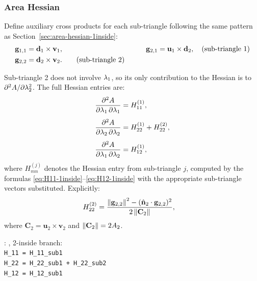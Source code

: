 \documentclass[11pt,a4paper]{article}
\begin{document}
\subsubsection{Area Hessian}

Define auxiliary cross products for each sub-triangle following the same
pattern as Section~\ref{sec:area-hessian-1inside}:
\begin{alignat}{2}
  \mathbf{g}_{1,1} &= \mathbf{d}_{1} \times \mathbf{v}_1, &\qquad
  \mathbf{g}_{2,1} &= \mathbf{u}_1 \times \mathbf{d}_{2},
  \quad\text{(sub-triangle 1)} \\
  \mathbf{g}_{2,2} &= \mathbf{d}_{2} \times \mathbf{v}_2.
  \qquad\text{(sub-triangle 2)}
\end{alignat}

Sub-triangle 2 does not involve $\lambda_1$, so its only contribution to the
Hessian is to $\partial^2 A / \partial\lambda_2^2$.  The full Hessian entries
are:
\begin{align}
  \dfrac{\partial^2 A}{\partial \lambda_1\,\partial \lambda_1} &= H^{(1)}_{11},
  \label{eq:H11-2inside} \\[4pt]
  \dfrac{\partial^2 A}{\partial \lambda_2\,\partial \lambda_2} &= H^{(1)}_{22} + H^{(2)}_{22},
  \label{eq:H22-2inside} \\[4pt]
  \dfrac{\partial^2 A}{\partial \lambda_1\,\partial \lambda_2} &= H^{(1)}_{12},
  \label{eq:H12-2inside}
\end{align}
where $H^{(j)}_{mn}$ denotes the Hessian entry from sub-triangle $j$,
computed by the formulas \eqref{eq:H11-1inside}--\eqref{eq:H12-1inside}
with the appropriate sub-triangle vectors substituted.  Explicitly:
\begin{align}
  H^{(2)}_{22}
    &= \frac{\left\|\mathbf{g}_{2,2}\right\|^2
             - (\hat{\mathbf{n}}_2\cdot\mathbf{g}_{2,2})^2}
            {2\left\|\mathbf{C}_2\right\|},
  \label{eq:H22-sub2}
\end{align}
where $\mathbf{C}_2 = \mathbf{u}_2 \times \mathbf{v}_2$ and $\left\|\mathbf{C}_2\right\|
= 2A_2$.

\begin{tcolorbox}[colback=blue!4!white, colframe=blue!40!black,
                  title={Code: 2-inside Hessian}, fontupper=\small]
: ,
2-inside branch:\\[2pt]
\texttt{H\_11 = H\_11\_sub1}\\
\texttt{H\_22 = H\_22\_sub1 + H\_22\_sub2}\\
\texttt{H\_12 = H\_12\_sub1}
\end{tcolorbox}

\end{document}
